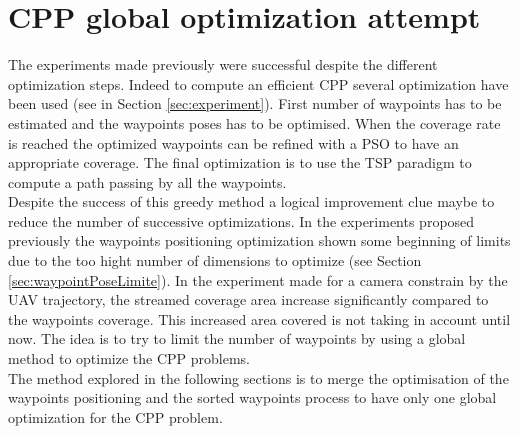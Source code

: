 \section{CPP global optimization attempt}

The experiments made previously were successful despite the different optimization steps. Indeed to compute an efficient CPP several optimization have been used (see in Section \ref{sec:experiment}). %
First number of waypoints has to be estimated and the waypoints poses has to be optimised. When the coverage rate is reached the optimized waypoints can be refined with a PSO to have an appropriate coverage. The final optimization is to use the TSP paradigm to compute a path passing by all the waypoints.%
\\Despite the success of this greedy method a logical improvement clue maybe to reduce the number of successive optimizations. In the experiments proposed previously the waypoints positioning optimization shown some beginning of limits due to the too hight number of dimensions to optimize (see Section \ref{sec:waypointPoseLimite}). 
In the experiment made for a camera constrain by the UAV trajectory, the streamed coverage area increase significantly compared to the waypoints coverage. This increased area covered is not taking in account until now. The idea is to try to limit the number of waypoints by using a global method to optimize the CPP problems.\\
The method explored in the following sections is to merge the optimisation of the waypoints positioning and the sorted waypoints process to have only one global optimization for the CPP problem. 
 
